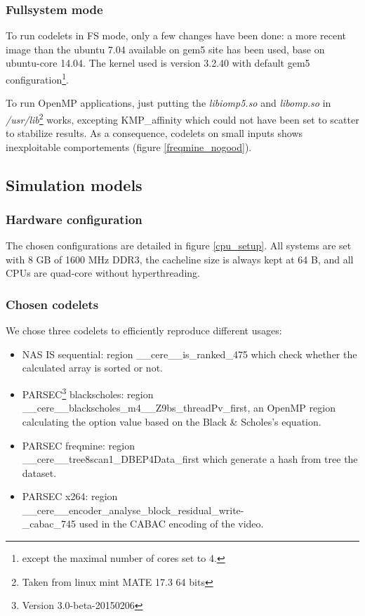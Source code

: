 \documentclass{article}
\begin{document}
\begin{multicols}{2}


\subsubsection{Fullsystem mode}
\label{FS_mode}
To run codelets in FS mode, only a few changes have been done: a more recent image than the ubuntu 7.04 available on gem5 site has been used, base on ubuntu-core 14.04. The kernel used is version 3.2.40 with default gem5 configuration\footnote{except the maximal number of cores set to 4.}.


To run OpenMP applications, just putting the \textit{libiomp5.so} and \textit{libomp.so} in \textit{/usr/lib}\footnote{Taken from linux mint MATE 17.3 64 bits} works, excepting KMP\_affinity which could not have been set to scatter to stabilize results. As a consequence, codelets on small inputs shows inexploitable comportements (figure \ref{freqmine_nogood}).

\subsection{Simulation models}
\subsubsection{Hardware configuration}
The chosen configurations are detailed in figure \ref{cpu_setup}. All systems are set with 8 GB of 1600 MHz DDR3, the cacheline size is always kept at 64 B, and all CPUs are quad-core without hyperthreading.

\subsubsection{Chosen codelets}
We chose three codelets to efficiently reproduce different usages:
\begin{itemize}
\item NAS IS sequential: region \_\_cere\_\_is\_ranked\_475 which check whether the calculated array is sorted or not.
\item PARSEC\footnote{Version 3.0-beta-20150206} blackscholes: region \\ \_\_cere\_\_blackscholes\_m4\_\_Z9bs\_threadPv\_first, an OpenMP region calculating the option value based on the Black \& Scholes's equation.
\item PARSEC freqmine: region\\ \_\_cere\_\_tree8scan1\_DBEP4Data\_first which generate a hash from tree the dataset.
\item PARSEC x264: region \\ \_\_cere\_\_encoder\_analyse\_block\_residual\_write-\\ \_cabac\_745 used in the CABAC encoding of the video.
\end{itemize}



\end{multicols}
\end{document}
